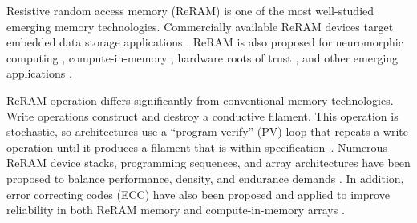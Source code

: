 
Resistive random access memory (ReRAM) is one of the most well-studied emerging memory technologies. Commercially available ReRAM devices target embedded data storage applications \cite{ramxeedreramproducts}.
ReRAM is also proposed for neuromorphic computing \cite{sung2018perspective}, compute-in-memory \cite{ielmini2018memory}, hardware roots of trust \cite{pang2019memristors}, and other emerging applications \cite{nirmal2024advancements}.




ReRAM operation differs significantly from conventional memory technologies.
Write operations construct and destroy a conductive filament.
This operation is stochastic, so architectures use a ``program-verify'' (PV) loop that repeats a write operation until it produces a filament that is within specification~\cite{yu2012switching, hayakawa2017resolving, fukuyama2019comprehensive, milo2021accurate}.
Numerous ReRAM device stacks, programming sequences, and array architectures have been proposed to balance performance, density, and endurance demands \cite{li2021memristive}.
In addition, error correcting codes (ECC) have also been proposed and applied to improve reliability in both ReRAM memory and compute-in-memory arrays \cite{hayakawa2017resolving, golonzka2019non, crafton2021cim, li202240nm}.

